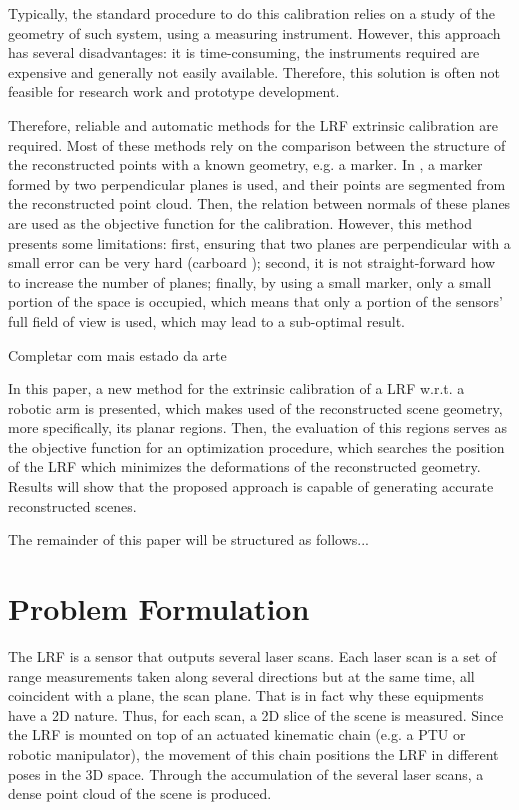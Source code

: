 \documentclass[conference]{IEEEtran}
\begin{document}
Typically, the standard procedure to do this calibration relies on a study of the geometry of such system, using a measuring instrument. However, this approach has several disadvantages: it is time-consuming, the instruments required are expensive and generally not easily available. Therefore, this solution is often not feasible for research work and prototype development.

Therefore, reliable and automatic methods for the LRF extrinsic calibration are required. Most of these methods rely on the comparison between the structure of the reconstructed points with a known geometry, e.g. a marker. In \cite{Kim2013}, a marker formed by two perpendicular planes is used, and their points are segmented from the reconstructed point cloud. Then, the relation between normals of these planes are used as the objective function for the calibration. However, this method presents some limitations: first, ensuring that two planes are perpendicular with a small error can be very hard (carboard ); second, it is not straight-forward how to increase the number of planes; finally, by using a small marker, only a small portion of the space is occupied, which means that only a portion of the sensors' full field of view is used, which may lead to a sub-optimal result.

{\color{red}
Completar com mais estado da arte}

In this paper, a new method for the extrinsic calibration of a LRF w.r.t. a robotic arm is presented, which makes used of the reconstructed scene geometry, more specifically, its planar regions. Then, the evaluation of this regions serves as the objective function for an optimization procedure, which searches the position of the LRF which minimizes the deformations of the reconstructed geometry. Results will show that the proposed approach is capable of generating accurate reconstructed scenes.

The remainder of this paper will be structured as follows...

\section{Problem Formulation}\label{section:problem-formulation}

The LRF is a sensor that outputs several laser scans. Each laser scan is a set of range measurements taken along several directions but at the same time, all coincident with a plane, the scan plane. That is in fact why these equipments have  a 2D nature. Thus, for each scan, a 2D slice of the scene is measured. Since the LRF is mounted on top of an actuated kinematic chain (e.g. a PTU or robotic manipulator), the movement of this chain positions the LRF in different poses in the 3D space. Through the accumulation of the several laser scans, a dense point cloud of the scene is produced. 
\end{document}
